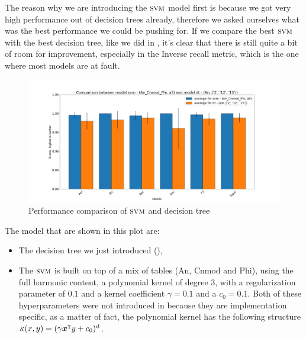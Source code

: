 The reason why we are introducing the $\textsc{svm}$ model first is because we got very high performance out
of decision trees already, therefore we asked ourselves what was the best performance we could be
pushing for. If we compare the best $\textsc{svm}$ with the best decision tree, like we did in
, it's clear that there is still quite a bit of room for improvement, especially in the Inverse recall metric, which is the one where most models are at fault.
\begin{figure}[h!]
	\centering
	\includegraphics[width=\linewidth]{img/svm_vs_dt.png}
	\caption{Performance comparison of $\textsc{svm}$ and decision tree} \label{fig:svm-vs-dt}
\end{figure}
The model that are shown in this plot are:
\begin{itemize}
	\item The decision tree we just introduced (),
	\item The $\textsc{svm}$ is built on top of a mix of tables (An, Cnmod and Phi), using the full
	      harmonic content, a polynomial kernel of degree $3$, with a regularization parameter
	      of $0.1$ and a kernel coefficient $\gamma = 0.1$ and a $c_0 = 0.1$. Both of these
	      hyperparameters were not introduced in  because they are
	      implementation specific, as a matter of fact, the polynomial kernel has the
	      following structure $\kappa(x, y) = (\gamma\boldsymbol{x}^\intercal y + c_0)^d$.
\end{itemize}

